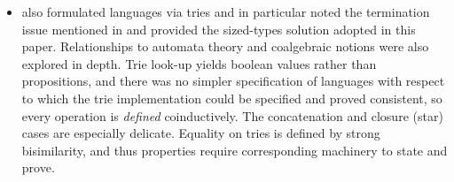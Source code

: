 \documentclass[acmsmall,screen,anonymous,timestamp]{acmart}
\begin{document}
\begin{itemize}
\item \citet{Abel2016} also formulated languages via tries and in particular noted the termination issue mentioned in  and provided the sized-types solution adopted in this paper.
Relationships to automata theory and coalgebraic notions were also explored in depth.
Trie look-up yields boolean values rather than propositions, and there was no simpler specification of languages with respect to which the trie implementation could be specified and proved consistent, so every operation is \emph{defined} coinductively.
The concatenation and closure (star) cases are especially delicate.
Equality on tries is defined by strong bisimilarity, and thus properties require corresponding machinery to state and prove.


\end{itemize}





\end{document}
